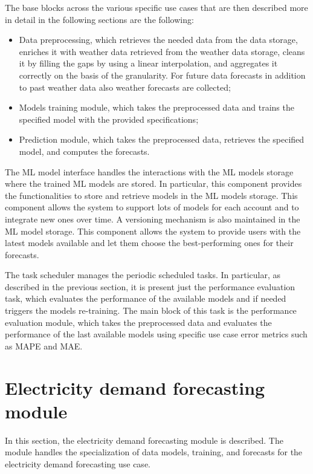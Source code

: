 The base blocks across the various specific use cases that are then described more in detail in the following sections are the following:
\begin{itemize}
  \item Data preprocessing, which retrieves the needed data from the data storage, enriches it with weather data retrieved from the weather data storage, cleans it by filling the gaps by using a linear interpolation, and aggregates it correctly on the basis of the granularity. For future data forecasts in addition to past weather data also weather forecasts are collected;
  \item Models training module, which takes the preprocessed data and trains the specified model with the provided specifications;
  \item Prediction module, which takes the preprocessed data, retrieves the specified model, and computes the forecasts.
\end{itemize}

The ML model interface handles the interactions with the ML models storage where the trained ML models are stored.
In particular, this component provides the functionalities to store and retrieve models in the ML models storage.
This component allows the system to support lots of models for each account and to integrate new ones over time.
A versioning mechanism is also maintained in the ML model storage.
This component allows the system to provide users with the latest models available and let them choose the best-performing ones for their forecasts.

The task scheduler manages the periodic scheduled tasks.
In particular, as described in the previous section, it is present just the performance evaluation task, which evaluates the performance of the available models and if needed triggers the models re-training.
The main block of this task is the performance evaluation module, which takes the preprocessed data and evaluates the performance of the last available models using specific use case error metrics such as MAPE and MAE.


\section{Electricity demand forecasting module}
\label{sec:demandmodel}
\vspace{0.2 cm}

In this section, the electricity demand forecasting module is described.
The module handles the specialization of data models, training, and forecasts for the electricity demand forecasting use case.

